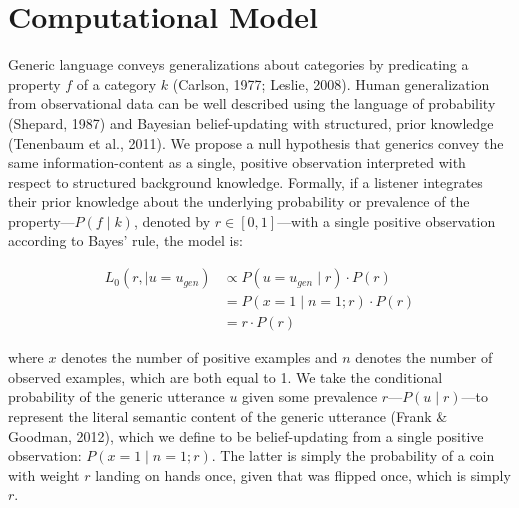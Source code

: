 \documentclass[floatsintext,doc]{apa6}
\begin{document}
\hypertarget{computational-model}{%
\section{Computational Model}\label{computational-model}}

Generic language conveys generalizations about categories by predicating a property $f$ of a category $k$ (Carlson, 1977; Leslie, 2008).
Human generalization from observational data can be well described using the language of probability (Shepard, 1987) and Bayesian belief-updating with structured, prior knowledge (Tenenbaum et al., 2011).
We propose a null hypothesis that generics convey the same information-content as a single, positive observation interpreted with respect to structured background knowledge.
Formally, if a listener integrates their prior knowledge about the underlying probability or prevalence of the property---$P(f \mid k)$, denoted by \(r \in [0, 1]\)---with a single positive observation according to Bayes' rule, the model is:


\begin{align}
L_0(r, \mid u = u_{gen}) &\propto P(u = u_{gen} \mid r) \cdot P(r)  \nonumber \\
 &= P(x = 1 \mid n = 1; r) \cdot P(r) \nonumber \\
 &= r \cdot P(r) \label{eq:L0}
\end{align}

\noindent where \(x\) denotes the number of positive examples and \(n\) denotes the number of observed examples, which are both equal to 1.
We take the conditional probability of the generic utterance \(u\) given some prevalence \(r\)---\(P(u\mid r)\)---to represent the literal semantic content of the generic utterance (Frank \& Goodman, 2012), which we define to be belief-updating from a single positive observation: \(P(x =1 \mid n = 1; r)\).
The latter is simply the probability of a coin with weight \(r\) landing on hands once, given that was flipped once, which is simply \(r\).
\end{document}
